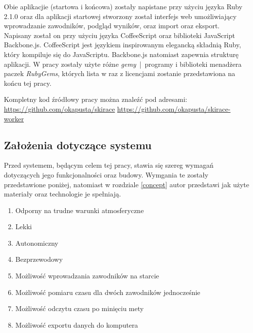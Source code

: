 \documentclass[11pt,a4paper, twoside]{article}
\begin{document}
Obie aplikacjie (startowa i końcowa) zostały napistane przy użyciu języka Ruby 2.1.0 oraz dla aplikacji startowej stworzony został interfejs web umożliwiający wprowadzanie zawodników, podgląd wyników, oraz import oraz eksport. Napisany został on przy użyciu języka CoffeeScript oraz biblioteki JavaScript Backbone.js. 
CoffeeScript jest językiem inspirowanym elegancką składnią Ruby, który kompiluje się do JavaScriptu. Backbone.js natomiast zapewnia strukturę aplikacji.
\newline
\newline
\noindent
W pracy zostały użyte różne \emph{gemy}~|~programy i biblioteki menadżera paczek \emph{RubyGems}, których lista w raz z licencjami zostanie przedstawiona na końcu tej pracy.
\newline

\noindent
Kompletny kod źródłowy pracy można znaleźć pod adresami:
\newline
\url{https://github.com/okapusta/skirace}
\newline
\url{https://github.com/okapusta/skirace-worker}

\newpage

\newpage
\noindent
\subsection{Założenia dotyczące systemu}
Przed systemem, będącym celem tej pracy, stawia się szereg wymagań dotyczących jego funkcjonalności oraz budowy. Wymgania te zostały przedstawione poniżej, natomiast w rozdziale \ref{concept} autor przedstawi jak użyte materiały oraz technologie je spełniają.
\begin{enumerate}
\item Odporny na trudne warunki atmosferyczne
\item Lekki
\item Autonomiczny
\item Bezprzewodowy
\item \label{req:entry} Możliwość wprowadzania zawodników na starcie
\item \label{req:two} Możliwość pomiaru czasu dla dwóch zawodników jednocześnie
\item \label{req:lcd} Możliwość odczytu czasu po minięciu mety 
\item \label{req:export} Możliwość exportu danych do komputera
\end{enumerate}
\newpage
\end{document}
